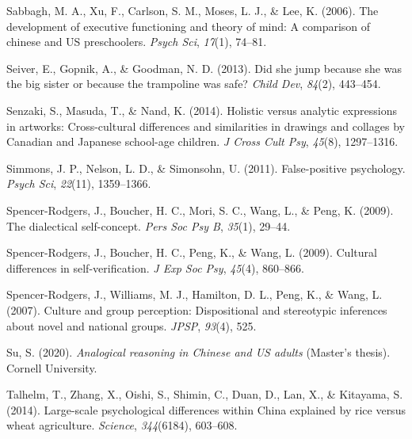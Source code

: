 \documentclass[
  man,floatsintext]{apa6}
\newlength{\cslhangindent}
\newlength{\cslentryspacingunit} %
\newenvironment{CSLReferences}[2] %
 {%
  \setlength{\parindent}{0pt}
  \ifodd #1
  \let\oldpar\par
  \def\par{\hangindent=\cslhangindent\oldpar}
  \fi
  \setlength{\parskip}{#2\cslentryspacingunit}
 }%
 {}
\begin{document}
\begin{CSLReferences}{1}{0}
\leavevmode{}%
Sabbagh, M. A., Xu, F., Carlson, S. M., Moses, L. J., \& Lee, K. (2006). The development of executive functioning and theory of mind: A comparison of chinese and US preschoolers. \emph{Psych Sci}, \emph{17}(1), 74--81.

\leavevmode{}%
Seiver, E., Gopnik, A., \& Goodman, N. D. (2013). Did she jump because she was the big sister or because the trampoline was safe? \emph{Child Dev}, \emph{84}(2), 443--454.

\leavevmode{}%
Senzaki, S., Masuda, T., \& Nand, K. (2014). Holistic versus analytic expressions in artworks: Cross-cultural differences and similarities in drawings and collages by {C}anadian and {J}apanese school-age children. \emph{J Cross Cult Psy}, \emph{45}(8), 1297--1316.

\leavevmode{}%
Simmons, J. P., Nelson, L. D., \& Simonsohn, U. (2011). False-positive psychology. \emph{Psych Sci}, \emph{22}(11), 1359--1366.

\leavevmode{}%
Spencer-Rodgers, J., Boucher, H. C., Mori, S. C., Wang, L., \& Peng, K. (2009). The dialectical self-concept. \emph{Pers Soc Psy B}, \emph{35}(1), 29--44.

\leavevmode{}%
Spencer-Rodgers, J., Boucher, H. C., Peng, K., \& Wang, L. (2009). Cultural differences in self-verification. \emph{J Exp Soc Psy}, \emph{45}(4), 860--866.

\leavevmode{}%
Spencer-Rodgers, J., Williams, M. J., Hamilton, D. L., Peng, K., \& Wang, L. (2007). Culture and group perception: Dispositional and stereotypic inferences about novel and national groups. \emph{JPSP}, \emph{93}(4), 525.

\leavevmode{}%
Su, S. (2020). \emph{Analogical reasoning in {C}hinese and {US} adults} (Master's thesis). Cornell University.

\leavevmode{}%
Talhelm, T., Zhang, X., Oishi, S., Shimin, C., Duan, D., Lan, X., \& Kitayama, S. (2014). Large-scale psychological differences within {C}hina explained by rice versus wheat agriculture. \emph{Science}, \emph{344}(6184), 603--608.


\end{CSLReferences}
\end{document}
